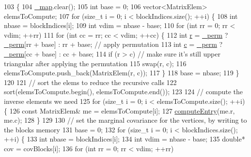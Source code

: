 \begin{DoxyCode}
103 \{
104   \hyperlink{classg2o_1_1MarginalCovarianceCholesky_a7a9d21e9ee6654b9e6d69a62e87c201a}{\_map}.clear();
105   \textcolor{keywordtype}{int} base = 0;
106   vector<MatrixElem> elemsToCompute;
107   \textcolor{keywordflow}{for} (\textcolor{keywordtype}{size\_t} i = 0; i < blockIndices.size(); ++i) \{
108     \textcolor{keywordtype}{int} nbase = blockIndices[i];
109     \textcolor{keywordtype}{int} vdim = nbase - base;
110     \textcolor{keywordflow}{for} (\textcolor{keywordtype}{int} rr = 0; rr < vdim; ++rr)
111       \textcolor{keywordflow}{for} (\textcolor{keywordtype}{int} cc = rr; cc < vdim; ++cc) \{
112         \textcolor{keywordtype}{int} \hyperlink{sparse__block__matrix_8hpp_acab531abaa74a7e664e3986f2522b33a}{r} = \hyperlink{classg2o_1_1MarginalCovarianceCholesky_a404f5d0ce82c2877324bafb8997b96aa}{\_perm} ? \hyperlink{classg2o_1_1MarginalCovarianceCholesky_a404f5d0ce82c2877324bafb8997b96aa}{\_perm}[rr + base] : rr + base; \textcolor{comment}{// apply permutation}
113         \textcolor{keywordtype}{int} \hyperlink{sparse__block__matrix_8hpp_a4e1e0e72dd773439e333c84dd762a9c3}{c} = \hyperlink{classg2o_1_1MarginalCovarianceCholesky_a404f5d0ce82c2877324bafb8997b96aa}{\_perm} ? \hyperlink{classg2o_1_1MarginalCovarianceCholesky_a404f5d0ce82c2877324bafb8997b96aa}{\_perm}[cc + base] : cc + base;
114         \textcolor{keywordflow}{if} (r > c) \textcolor{comment}{// make sure it's still upper triangular after applying the permutation}
115           swap(r, c);
116         elemsToCompute.push\_back(MatrixElem(r, c));
117       \}
118     base = nbase;
119   \}
120 
121   \textcolor{comment}{// sort the elems to reduce the recursive calls}
122   sort(elemsToCompute.begin(), elemsToCompute.end());
123 
124   \textcolor{comment}{// compute the inverse elements we need}
125   \textcolor{keywordflow}{for} (\textcolor{keywordtype}{size\_t} i = 0; i < elemsToCompute.size(); ++i) \{
126     \textcolor{keyword}{const} MatrixElem& me = elemsToCompute[i];
127     \hyperlink{classg2o_1_1MarginalCovarianceCholesky_a556f8da80f0873b74b57c82b587b4f97}{computeEntry}(me.r, me.c);
128   \}
129 
130   \textcolor{comment}{// set the marginal covariance for the vertices, by writing to the blocks memory}
131   base = 0;
132   \textcolor{keywordflow}{for} (\textcolor{keywordtype}{size\_t} i = 0; i < blockIndices.size(); ++i) \{
133     \textcolor{keywordtype}{int} nbase = blockIndices[i];
134     \textcolor{keywordtype}{int} vdim = nbase - base;
135     \textcolor{keywordtype}{double}* cov = covBlocks[i];
136     \textcolor{keywordflow}{for} (\textcolor{keywordtype}{int} rr = 0; rr < vdim; ++rr)

\end{DoxyCode}
